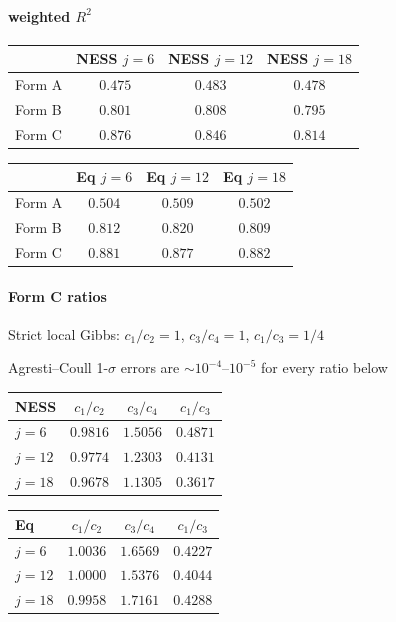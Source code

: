 \documentclass[11pt]{article}
\begin{document}
\paragraph{weighted $R^2$}
\begin{center}
\begin{tabular}{lccc}
\toprule
       & NESS $j=6$ & NESS $j=12$ & NESS $j=18$ \\
\midrule
Form A & $0.475$ & $0.483$ & $0.478$ \\
Form B & $0.801$ & $0.808$ & $0.795$ \\
Form C & $0.876$ & $0.846$ & $0.814$ \\
\bottomrule
\end{tabular}
\hspace{1em}
\begin{tabular}{lccc}
\toprule
       & Eq $j=6$ & Eq $j=12$ & Eq $j=18$ \\
\midrule
Form A & $0.504$ & $0.509$ & $0.502$ \\
Form B & $0.812$ & $0.820$ & $0.809$ \\
Form C & $0.881$ & $0.877$ & $0.882$ \\
\bottomrule
\end{tabular}
\end{center}

\paragraph{Form C ratios}
Strict local Gibbs: $c_1/c_2=1$, $c_3/c_4=1$, $c_1/c_3=1/4$

Agresti--Coull 1-$\sigma$ errors are $\sim 10^{-4}$--$10^{-5}$ for every
ratio below

\begin{center}
\begin{tabular}{lccc}
\toprule
NESS & $c_1/c_2$ & $c_3/c_4$ & $c_1/c_3$ \\
\midrule
$j=6$  & $0.9816$ & $1.5056$ & $0.4871$ \\
$j=12$ & $0.9774$ & $1.2303$ & $0.4131$ \\
$j=18$ & $0.9678$ & $1.1305$ & $0.3617$ \\
\bottomrule
\end{tabular}
\hspace{1em}
\begin{tabular}{lccc}
\toprule
Eq & $c_1/c_2$ & $c_3/c_4$ & $c_1/c_3$ \\
\midrule
$j=6$  & $1.0036$ & $1.6569$ & $0.4227$ \\
$j=12$ & $1.0000$ & $1.5376$ & $0.4044$ \\
$j=18$ & $0.9958$ & $1.7161$ & $0.4288$ \\
\bottomrule
\end{tabular}
\end{center}
\end{document}
